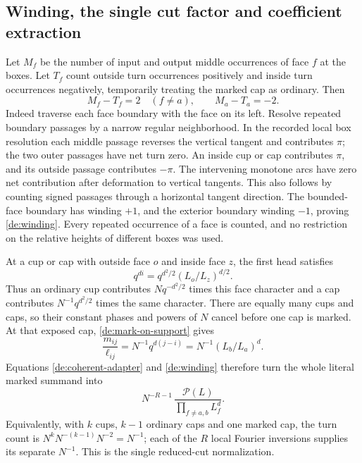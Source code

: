 \subsection{Winding, the single cut factor and coefficient extraction}

Let \(M_f\) be the number of input and output middle occurrences
of face \(f\) at the boxes. Let \(T_f\) count outside turn
occurrences positively and inside turn occurrences negatively,
temporarily treating the marked cap as ordinary.
Then
\begin{equation}\label{de:winding}
 M_f-T_f=2\quad(f\ne a),\qquad M_a-T_a=-2.
\end{equation}
Indeed traverse each face boundary with the face on its left.
Resolve repeated boundary passages by a narrow regular
neighborhood. In the recorded local box resolution each middle
passage reverses the vertical tangent and contributes \(\pi\);
the two outer passages have net turn zero. An inside cup or cap
contributes \(\pi\), and its outside passage contributes
\(-\pi\). The intervening monotone arcs have zero net contribution
after deformation to vertical tangents. This also follows by
counting signed passages through a horizontal tangent direction.
The bounded-face boundary has winding \(+1\), and the exterior
boundary winding \(-1\), proving \eqref{de:winding}. Every repeated
occurrence of a face is counted, and no restriction on the
relative heights of different boxes was used.

At a cup or cap with outside face \(o\) and inside face \(z\),
the first head satisfies
\[
 q^{di}=q^{d^2/2}(L_o/L_z)^{d/2}.
\]
Thus an ordinary cup contributes \(Nq^{-d^2/2}\) times this
face character and a cap contributes \(N^{-1}q^{d^2/2}\) times
the same character. There are equally many cups and caps, so
their constant phases and powers of \(N\) cancel before one cap
is marked. At that exposed cap, \eqref{de:mark-on-support} gives
\begin{equation}\label{de:mark-ratio}
 \frac{m_{ij}}{\ell_{ij}}
      =N^{-1}q^{d(j-i)}
      =N^{-1}(L_b/L_a)^d.
\end{equation}
Equations \eqref{de:coherent-adapter} and \eqref{de:winding}
therefore turn the whole literal marked summand into
\begin{equation}\label{de:marked-summand}
 N^{-R-1}\,
       \frac{\mathcal P(L)}{\prod_{f\ne a,b}L_f^d}.
\end{equation}
Equivalently, with \(k\) cups, \(k-1\) ordinary caps and one
marked cap, the turn count is
\(N^kN^{-(k-1)}N^{-2}=N^{-1}\); each of the \(R\) local Fourier
inversions supplies its separate \(N^{-1}\).
This is the single reduced-cut normalization.


